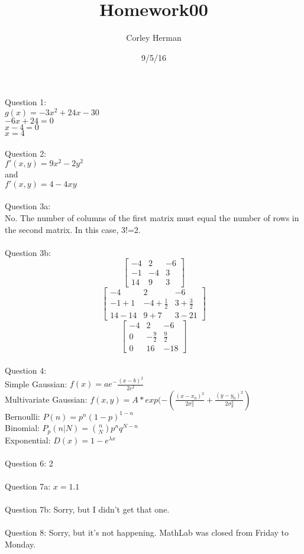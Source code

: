 \documentclass[a4paper]{article}
\title{Homework00}
\author{Corley Herman}
\date{9/5/16}
\begin{document}
\lstset{language=Python}

\maketitle

Question 1:\\
$g(x)=-3x^2+24x-30$\\
$-6x+24=0$\\
$x-4=0$\\
$x=4$\\
\\
Question 2:\\
$f'(x,y)=9x^2-2y^2$\\
and\\
$f'(x,y)=4-4xy$\\
\\
Question 3a:\\
No. The number of columns of the first matrix must equal the number of rows in the second matrix. In this case, 3!=2.\\
\\
Question 3b:\[ \left[ \begin{array}{rrr}
-4 & 2 & -6 \\
-1 & -4 & 3 \\
14 & 9 & 3 \end{array} \right] \]
\[ \left[ \begin{array}{ccc}
-4 & 2 & -6 \\
-1+1 & -4+\frac{1}{2} & 3+\frac{3}{2} \\
14-14 & 9+7 & 3-21 \end{array} \right] \]
\[ \left[ \begin{array}{rrr}
-4 & 2 & -6 \\
0 & -\frac{9}{2} & \frac{9}{2} \\
0 & 16 & -18 \end{array} \right] \]
\\
Question 4:\\
Simple Gaussian: $f(x)=ae^-\frac{(x-b)^2}{2c^2}$\\
Multivariate Gaussian: $f(x,y) = A*exp(-(\frac{(x-x_0)^2}{2\sigma_x^2}+\frac{(y-y_0)^2}{2\sigma_y^2})$\\
Bernoulli: $P(n)=p^n(1-p)^{1-n}$\\
Binomial: $P_p(n|N)=\binom{n}{N}p^nq^{N-n}$\\
Exponential: $D(x)=1-e^{\lambda x}$\\
\\
Question 6: 2\\
\\
Question 7a: $x=1.1$\\
\\
Question 7b: Sorry, but I didn't get that one.\\
\\
Question 8: Sorry, but it's not happening. MathLab was closed from Friday to Monday.
\end{document}
